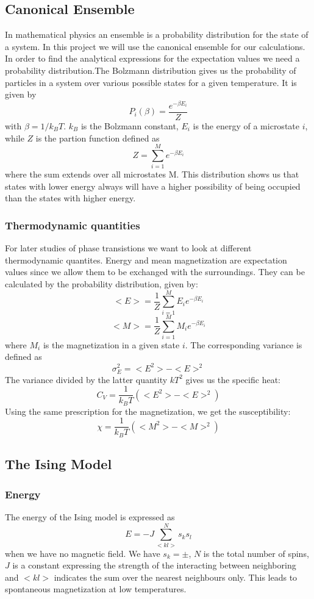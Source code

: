 \documentclass{article}
\begin{document}
\subsection*{Canonical Ensemble}
In mathematical physics an ensemble is a probability distribution for the state of a system. In this project we will use the canonical ensemble for our calculations. 
In order to find the analytical expressions for the expectation values we need a probability distribution.The Bolzmann distribution gives us the probability of particles in a system over various possible states for a given temperature. It is given by 
$$P_i(\beta) = \frac{e^{-\beta E_i}}{Z} $$
with $\beta = 1/k_B T$. $k_B$ is the Bolzmann constant, $E_i$ is the energy of a microstate $i$, while $Z$ is the partion function defined as 
$$Z = \sum_{i=1}^M e^{-\beta E_i}$$
where the sum extends over all microstates M. This distribution shows us that states with lower energy always will have a higher possibility of being occupied than the states with higher energy. 
\subsubsection*{Thermodynamic quantities}
For later studies of phase transistions we want to look at different thermodynamic quantites. 
Energy and mean magnetization are expectation values since we allow them to be exchanged with the surroundings. They can be calculated by the probability distribution, given by:
$$<E> = \frac{1}{Z}\sum_{i=1}^M E_ie^{-\beta E_i}$$ 
$$<M> = \frac{1}{Z}\sum_{i=1}^M M_ie^{-\beta E_i} $$
where $M_i$ is the magnetization in a given state $i$. 
The corresponding variance is defined as
$$\sigma^2_E = <E^2> - <E>^2 $$
The variance divided by the latter quantity $kT^2$ gives us the specific heat: 
$$C_V = \frac{1}{k_B T}(<E^2> - <E>^2)$$
Using the same prescription for the magnetization, we get the susceptibility: 
$$\chi = \frac{1}{k_B T}(<M^2> - <M>^2)$$
\subsection*{The Ising Model}
\subsubsection*{Energy}
The energy of the Ising model is expressed as 
$$E = -J\sum_{<kl>}^Ns_k s_l $$
when we have no magnetic field. We have $s_k = \pm$, $N$ is the total number of spins, $J$ is a constant expressing the strength of the interacting between neighboring and $<kl>$ indicates the sum over the nearest neighbours only. 
This leads to spontaneous magnetization at low temperatures.
\end{document}
